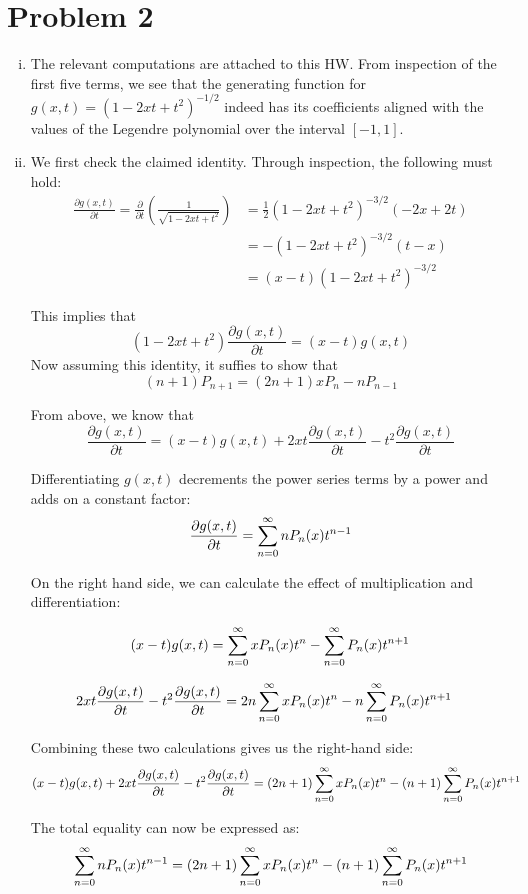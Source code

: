 \documentclass[12pt]{article}%
\newcommand{\gpart}[1][t]{\frac{\partial g(x,t)}{\partial {#1}}}
\begin{document}
\section*{Problem 2}
\begin{enumerate}[i.]
  \item The relevant computations are attached to this HW. From inspection of the first five terms, we see that the generating function for $g(x,t) = (1 - 2xt + t^2)^{-1/2}$ indeed has its coefficients aligned with the values of the Legendre polynomial over the interval $[-1,1]$.

  \item We first check the claimed identity. Through inspection, the following must hold:
  \begin{align*}
    \gpart = \frac{\partial}{\partial t}\left( \frac{1}{\sqrt{1 - 2xt + t^2}}\right) & = \frac{1}{2} (1-2xt + t^2)^{-3/2} (-2x + 2t) \\
    & = - (1 - 2xt + t^2)^{-3/2} (t-x) \\
    & = (x-t) (1 - 2xt + t^2)^{-3/2}
  \end{align*}

  This implies that \[ (1 - 2xt + t^2) \gpart  = (x-t)g(x,t) \] Now assuming this identity, it suffies to show that \[ (n+1)P_{n+1} = (2n + 1)xP_n - nP_{n-1} \]

  From above, we know that
  \[ \gpart = (x-t)g(x,t) + 2xt \gpart - t^2 \gpart\]

  Differentiating $g(x,t)$ decrements the power series terms by a power and adds on a constant factor:
  \[ \gpart = \powaseries n P_n(x)t^{n-1} \]

  On the right hand side, we can calculate the effect of multiplication and differentiation:

  \[ (x-t)g(x,t) = \sum_{n = {0}}^{\infty} xP_n(x) t^n - \sum_{n = {0}}^{\infty} P_n(x)t^{n+1}\]

  \begin{align*}
      2xt \gpart - t^2 \gpart & = 2n \powaseries xP_n(x)t^n - n \powaseries P_n(x)t^{n+1}
  \end{align*}

  Combining these two calculations gives us the right-hand side:
  \begin{align*}
      (x-t)g(x,t) + 2xt \gpart - t^2 \gpart & = (2n+1) \powaseries xP_n(x)t^n - (n+1) \powaseries P_n(x)t^{n+1}
  \end{align*}

  The total equality can now be expressed as:
  \[ \sum_{n = {0}}^{\infty} n P_n(x)t^{n-1} = (2n+1) \sum_{n = {0}}^{\infty} xP_n(x)t^n - (n+1) \sum_{n = {0}}^{\infty} P_n(x)t^{n+1}\]


\end{enumerate}
\end{document}
